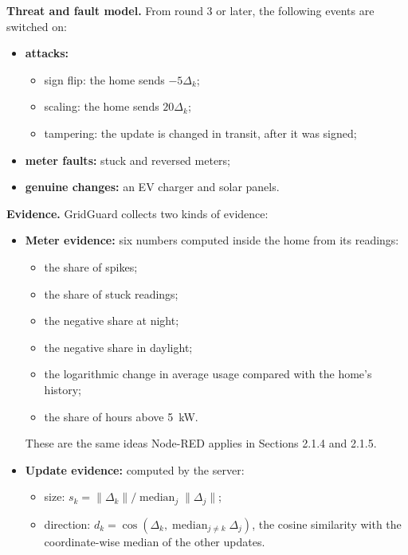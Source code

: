 \documentclass[12pt,a4paper,oneside]{report}
\begin{document}
\textbf{Threat and fault model.} From round 3 or later, the following events are switched on:

\begin{itemize}
\item \textbf{attacks:}
  \begin{itemize}
  \item sign flip: the home sends $-5\Delta_k$;
  \item scaling: the home sends $20\Delta_k$;
  \item tampering: the update is changed in transit, after it was signed;
  \end{itemize}
\item \textbf{meter faults:} stuck and reversed meters;
\item \textbf{genuine changes:} an EV charger and solar panels.
\end{itemize}

\textbf{Evidence.} GridGuard collects two kinds of evidence:

\begin{itemize}
\item \textbf{Meter evidence:} six numbers computed inside the home from its readings:
  \begin{itemize}
  \item the share of spikes;
  \item the share of stuck readings;
  \item the negative share at night;
  \item the negative share in daylight;
  \item the logarithmic change in average usage compared with the home's history;
  \item the share of hours above 5~kW.
  \end{itemize}
  These are the same ideas Node-RED applies in Sections 2.1.4 and 2.1.5.
\item \textbf{Update evidence:} computed by the server:
  \begin{itemize}
  \item size: $s_k = \lVert\Delta_k\rVert / \operatorname{median}_j \lVert\Delta_j\rVert$;
  \item direction: $d_k = \cos(\Delta_k, \operatorname{median}_{j\neq k}\Delta_j)$, the cosine similarity with the coordinate-wise median of the other updates.
  \end{itemize}
\end{itemize}
\end{document}
